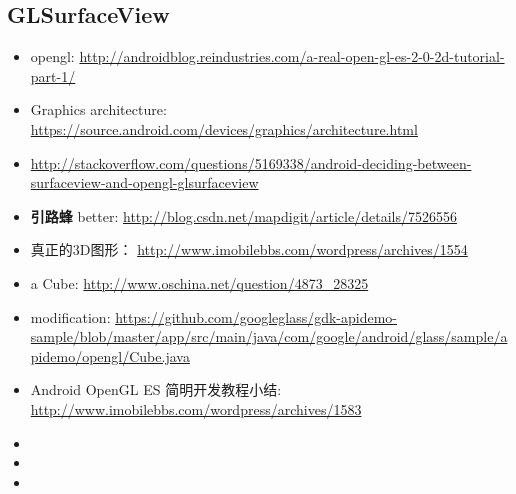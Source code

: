 \documentclass[9pt,b5paper]{article}
\begin{document}
\subsection{GLSurfaceView}
\label{sec-2-2}
\begin{itemize}
\item opengl: \url{http://androidblog.reindustries.com/a-real-open-gl-es-2-0-2d-tutorial-part-1/}
\item Graphics architecture: \url{https://source.android.com/devices/graphics/architecture.html}
\item \url{http://stackoverflow.com/questions/5169338/android-deciding-between-surfaceview-and-opengl-glsurfaceview}
\item \textbf{引路蜂} better: \url{http://blog.csdn.net/mapdigit/article/details/7526556}
\item 真正的3D图形： \url{http://www.imobilebbs.com/wordpress/archives/1554}
\item a Cube: \url{http://www.oschina.net/question/4873_28325}
\item modification: \url{https://github.com/googleglass/gdk-apidemo-sample/blob/master/app/src/main/java/com/google/android/glass/sample/apidemo/opengl/Cube.java}
\item Android OpenGL ES 简明开发教程小结: \url{http://www.imobilebbs.com/wordpress/archives/1583}
\item 
\item 
\item 


\end{itemize}
\end{document}

